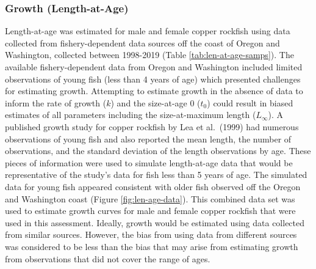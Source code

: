 \documentclass[11pt,
  english,
  a4paper,
]{article}
\begin{document}
\leavevmode\tagmcend\tagstructend\par


\hypertarget{growth-length-at-age}{%
\subsubsection{Growth (Length-at-Age)}\label{growth-length-at-age}}

\leavevmode\tagmcend\tagstructend


Length-at-age was estimated for male and female copper rockfish using data collected from fishery-dependent data sources off the coast of Oregon and Washington, collected between 1998-2019 (Table \ref{tab:len-at-age-samps}). The available fishery-dependent data from Oregon and Washington included limited observations of young fish (less than 4 years of age) which presented challenges for estimating growth. Attempting to estimate growth in the absence of data to inform the rate of growth ({\(k\)\leavevmode\tagmcend\tagstructend}) and the size-at-age 0 ({\(t_0\)\leavevmode\tagmcend\tagstructend}) could result in biased estimates of all parameters including the size-at-maximum length ({\(L_{\infty}\)\leavevmode\tagmcend\tagstructend}). A published growth study for copper rockfish by Lea et al.~{(1999)\leavevmode\tagmcend\tagstructend} had numerous observations of young fish and also reported the mean length, the number of observations, and the standard deviation of the length observations by age. These pieces of information were used to simulate length-at-age data that would be representative of the study's data for fish less than 5 years of age. The simulated data for young fish appeared consistent with older fish observed off the Oregon and Washington coast (Figure \ref{fig:len-age-data}). This combined data set was used to estimate growth curves for male and female copper rockfish that were used in this assessment. Ideally, growth would be estimated using data collected from similar sources. However, the bias from using data from different sources was considered to be less than the bias that may arise from estimating growth from observations that did not cover the range of ages.
\end{document}
